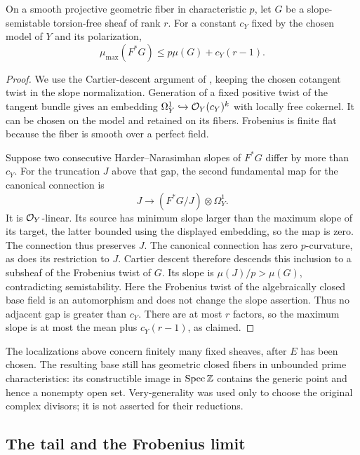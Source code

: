 \begin{lemma}\label{lem:frobenius-slope-gap}
On a smooth projective geometric fiber in characteristic $p$, let
$G$ be a slope-semistable torsion-free sheaf of rank $r$.
For a constant $c_Y$ fixed by the chosen model of $Y$ and its
polarization,
\begin{equation}\label{eq:frobenius-slope-gap}
 \mu_{\max}(F^*G)\leq p\mu(G)+c_Y(r-1).
\end{equation}
\end{lemma}

\begin{proof}
We use the Cartier-descent argument of
\cite[Theorem~4.1 and Proposition~4.2]{Langer2022}, keeping the
chosen cotangent twist in the slope normalization.
Generation of a fixed positive twist of the tangent bundle gives
an embedding $\Omega_Y^1\hookrightarrow\mathcal O_Y(c_Y)^k$ with locally
free cokernel.  It can be chosen on the model and retained on its
fibers.  Frobenius is finite flat because the fiber is smooth over
a perfect field.

Suppose two consecutive Harder--Narasimhan slopes of $F^*G$ differ
by more than $c_Y$.  For the truncation $J$ above that gap, the
second fundamental map for the canonical connection is
\[
 J\longrightarrow(F^*G/J)\otimes\Omega_Y^1.
\]
It is $\mathcal O_Y$-linear.  Its source has minimum slope larger than
the maximum slope of its target, the latter bounded using the
displayed embedding, so the map is zero.  The connection thus
preserves $J$.  The canonical connection has zero $p$-curvature,
as does its restriction to $J$.  Cartier descent therefore
descends this inclusion to a subsheaf of the Frobenius twist of
$G$.  Its slope is $\mu(J)/p>\mu(G)$, contradicting semistability.
Here the Frobenius twist of the algebraically closed base field
is an automorphism and does not change the slope assertion.
Thus no adjacent gap is greater than $c_Y$.  There are at most
$r$ factors, so the maximum slope is at most the mean plus
$c_Y(r-1)$, as claimed.
\end{proof}

The localizations above concern finitely many fixed sheaves, after
$E$ has been chosen.  The resulting base still has geometric closed
fibers in unbounded prime characteristics: its constructible image
in $\operatorname{Spec}\mathbb Z$ contains the generic point and hence a nonempty open
set.  Very-generality was used only to choose the original complex
divisors; it is not asserted for their reductions.

\subsection{The tail and the Frobenius limit}


